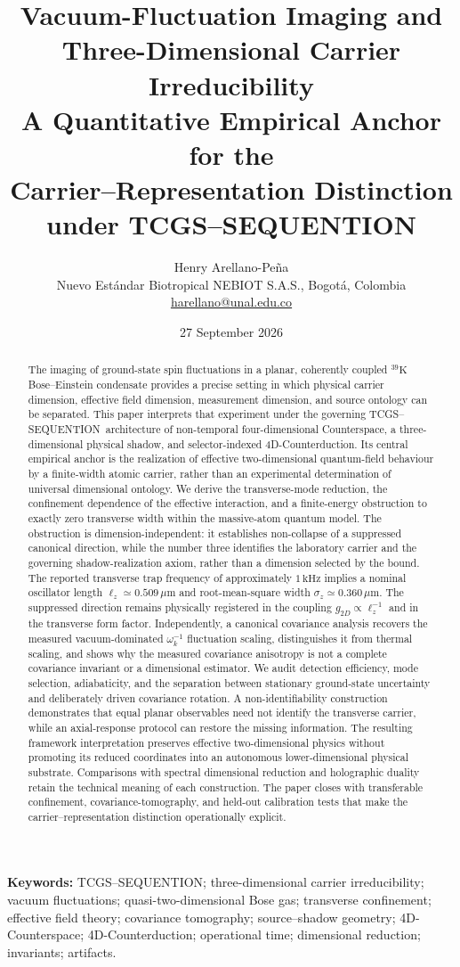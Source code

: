 \documentclass[11pt,a4paper]{article}
\title{Vacuum-Fluctuation Imaging and\\
Three-Dimensional Carrier Irreducibility\\[0.6em]
\large A Quantitative Empirical Anchor for the\\
Carrier--Representation Distinction under TCGS--SEQUENTION}
\author{Henry Arellano-Pe\~na\\\small Nuevo Est\'andar Biotropical NEBIOT S.A.S., Bogot\'a, Colombia\\\small\href{mailto:harellano@unal.edu.co}{harellano@unal.edu.co}}
\date{27 September 2026}
\theoremstyle{definition}
\theoremstyle{remark}
\newcommand{\TCGS}{TCGS--SEQUENTION}
\newcommand{\lop}{\ell_z}
\begin{document}
\maketitle
\begin{abstract}
The imaging of ground-state spin fluctuations in a planar, coherently coupled $^{39}\mathrm K$ Bose--Einstein condensate provides a precise setting in which physical carrier dimension, effective field dimension, measurement dimension, and source ontology can be separated. This paper interprets that experiment under the governing \TCGS\ architecture of non-temporal four-dimensional Counterspace, a three-dimensional physical shadow, and selector-indexed 4D-Counterduction. Its central empirical anchor is the realization of effective two-dimensional quantum-field behaviour by a finite-width atomic carrier, rather than an experimental determination of universal dimensional ontology. We derive the transverse-mode reduction, the confinement dependence of the effective interaction, and a finite-energy obstruction to exactly zero transverse width within the massive-atom quantum model. The obstruction is dimension-independent: it establishes non-collapse of a suppressed canonical direction, while the number three identifies the laboratory carrier and the governing shadow-realization axiom, rather than a dimension selected by the bound. The reported transverse trap frequency of approximately $1\,\mathrm{kHz}$ implies a nominal oscillator length $\lop\simeq0.509\,\mu\mathrm m$ and root-mean-square width $\sigma_z\simeq0.360\,\mu\mathrm m$. The suppressed direction remains physically registered in the coupling $g_{2D}\propto\lop^{-1}$ and in the transverse form factor. Independently, a canonical covariance analysis recovers the measured vacuum-dominated $\omega_k^{-1}$ fluctuation scaling, distinguishes it from thermal scaling, and shows why the measured covariance anisotropy is not a complete covariance invariant or a dimensional estimator. We audit detection efficiency, mode selection, adiabaticity, and the separation between stationary ground-state uncertainty and deliberately driven covariance rotation. A non-identifiability construction demonstrates that equal planar observables need not identify the transverse carrier, while an axial-response protocol can restore the missing information. The resulting framework interpretation preserves effective two-dimensional physics without promoting its reduced coordinates into an autonomous lower-dimensional physical substrate. Comparisons with spectral dimensional reduction and holographic duality retain the technical meaning of each construction. The paper closes with transferable confinement, covariance-tomography, and held-out calibration tests that make the carrier--representation distinction operationally explicit.
\end{abstract}
\noindent\textbf{Keywords:} \TCGS; three-dimensional carrier irreducibility; vacuum fluctuations; quasi-two-dimensional Bose gas; transverse confinement; effective field theory; covariance tomography; source--shadow geometry; 4D-Counterspace; 4D-Counterduction; operational time; dimensional reduction; invariants; artifacts.
\end{document}
